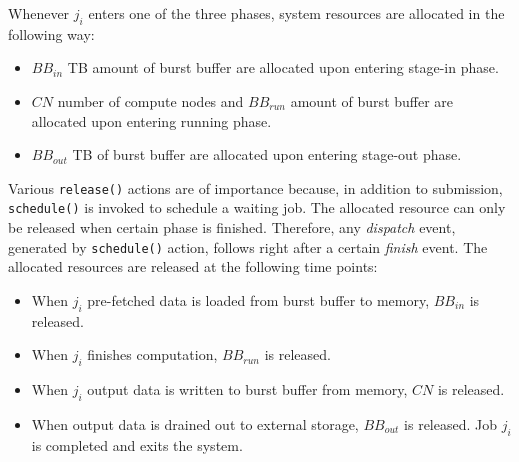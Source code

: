 Whenever $j_i$ enters one of the three phases, 
system resources are allocated in the following way:
\begin{itemize}
        \item $BB_{in}$ TB amount of burst buffer are allocated upon entering stage-in phase.
        \item $CN$ number of compute nodes and $BB_{run}$ amount of burst buffer
                are allocated upon entering running phase.
        \item $BB_{out}$ TB of burst buffer are allocated upon entering stage-out phase.
\end{itemize}
Various \texttt{release()} actions are of importance because, in addition to submission,
\texttt{schedule()} is invoked to schedule a waiting job. 
The allocated resource can only be released when certain phase is finished. 
Therefore, any \textit{dispatch} event, generated by \texttt{schedule()} action, 
follows right after a certain \textit{finish} event.
The allocated resources are released at the following time points:
\begin{itemize}
        \item When $j_i$ pre-fetched data is loaded from burst buffer to memory,
	      $BB_{in}$ is released.
        \item When $j_i$ finishes computation, 
	      $BB_{run}$ is released.
        \item When $j_i$ output data is written to burst buffer from memory,
	      $CN$ is released.
        \item When output data is drained out to external storage,
	      $BB_{out}$ is released.
                Job $j_i$ is completed and exits the system.
\end{itemize}





